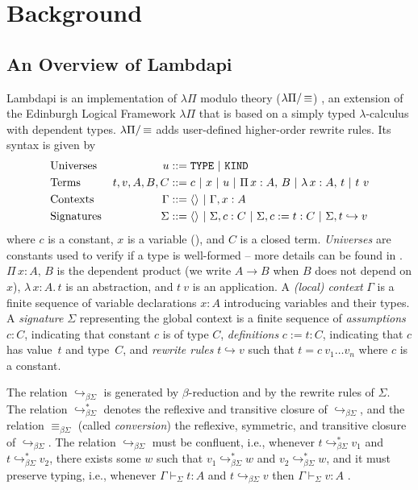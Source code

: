 \section{Background}
\label{sec:background}

\subsection{An Overview of Lambdapi}
\label{ssect:lambdapi-overview}

Lambdapi is an implementation of $\lambda\Pi$ modulo theory ($\lpm$) \cite{lambdapi}, an extension of the Edinburgh Logical Framework $\lambda\Pi$ \cite{lf} that is based on a simply typed $\lambda$-calculus with dependent types. $\lpm$ adds user-defined higher-order rewrite rules. Its syntax is given by
%
\begin{align*}
&\text{Universes}  &u &::= \tt{TYPE} ~|~ \tt{KIND} \\
&\text{Terms}   &t,v, A,B,C &::= c ~|~ x ~|~ u ~|~ \Pi\,x : A,\,B~|~ \lambda\,x : A,\,t ~|~t~v \\
&\text{Contexts}   &\Gamma &::= \langle \rangle ~|~ \Gamma, x : A \\
&\text{Signatures}  &\Sigma &::= \langle \rangle ~|~ \Sigma, c : C ~|~ \Sigma, c := t : C ~|~ \Sigma, t \hookrightarrow v 
\end{align*}
%
where $c$ is a constant, $x$ is a variable  (), and $C$ is a closed term. \emph{Universes} are constants used to verify if a type is well-formed -- more details can be found in \cite[\S 2.1]{lf}. $\Pi\,x : A,\,B$ is the dependent product (we write $A \rightarrow B$ when $B$ does not depend on $x$), $\lambda\,x : A.\,t$ is an abstraction, and  $t~v$ is an application. A \emph{(local) context} $\Gamma$ is a finite sequence of variable declarations $x:A$ introducing variables and their types.
A \emph{signature} $\Sigma$ representing the global context is a finite sequence of \emph{assumptions} $c : C$, indicating that constant $c$ is of type $C$, \emph{definitions} $c := t : C$, indicating that $c$ has value~$t$ and type~$C$, and \emph{rewrite rules} $t \hookrightarrow v$ such that $t = c~v_1 \dots v_n$ where $c$ is a constant.

The relation $\hookrightarrow_{\beta\Sigma}$ is generated by $\beta$-reduction and by the rewrite rules of $\Sigma$. The relation $\hookrightarrow_{\beta\Sigma}^*$ denotes the reflexive and transitive closure of $\hookrightarrow_{\beta\Sigma}$, and the relation $\equiv_{\beta\Sigma}$ (called \emph{conversion}) the reflexive, symmetric, and transitive closure of $\hookrightarrow_{\beta\Sigma}$. 
The relation $\hookrightarrow_{\beta\Sigma}$ must be confluent, i.e.,
whenever $t \hookrightarrow_{\beta\Sigma}^* v_1$ and $t \hookrightarrow_{\beta\Sigma}^* v_2$, there exists some $w$ such that $v_1 \hookrightarrow_{\beta\Sigma}^* w$ and $v_2 \hookrightarrow_{\beta\Sigma}^* w$, and it must preserve typing, i.e., 
whenever $\Gamma \vdash_\Sigma t: A$ and $t \hookrightarrow_{\beta\Sigma} v$ then $\Gamma \vdash_\Sigma v: A$ \cite{blanqui:LIPIcs.FSCD.2020.13}.


